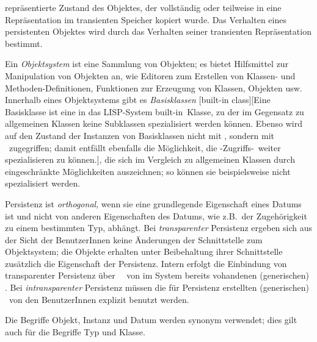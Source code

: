repr\"{a}sentierte Zustand des Objektes, der vollst\"{a}ndig oder teilweise
in eine Re\-pr\"{a}\-sen\-ta\-tion im transienten Speicher kopiert wurde.
Das Verhalten eines persistenten Objektes wird durch das Verhalten
seiner transienten Re\-pr\"{a}\-sen\-ta\-tion bestimmt.
%
\par{}Ein {\em Objektsystem\/} ist eine Sammlung von Objekten; es
bietet Hilfsmittel zur Manipulation von Objekten an, wie Editoren zum
Erstellen von Klassen- und Methoden-Definitionen, Funktionen
zur Erzeugung von Klassen, Objekten usw. Innerhalb eines Objektsystems
gibt es {\em Basisklassen\/}%
[built-in class][{Eine Basisklasse ist eine
in das LISP-System
\protect{}%
{built-in}\ Klasse, zu der im Gegensatz zu allgemeinen Klassen keine
Subklassen spezialisiert werden k\"{o}nnen. Ebenso wird auf den Zustand
der Instanzen von Basisklassen nicht mit \protect\mtd[n], sondern mit
\protect\fn[en]\ zugegriffen; damit entf\"{a}llt ebenfalls die
M\"{o}g\-lich\-keit, die \protect\std-Zugriffs-\protect\mtd[n]\ weiter
spezialisieren zu k\"{o}nnen.}], die sich im Vergleich zu allgemeinen
Klassen durch eingeschr\"{a}nkte M\"{o}glichkeiten auszeichnen; so k\"{o}nnen
sie beispielsweise nicht spezialisiert werden.
%
\par{}Persistenz ist {\em orthogonal\/}, wenn sie eine grundlegende
Eigenschaft eines Datums ist und nicht von anderen Eigenschaften des
Datums, wie z.B.\ der Zugeh\"{o}rigkeit zu einem bestimmten Typ,
abh\"{a}ngt. Bei {\em transparenter\/} Persistenz ergeben sich aus der
Sicht der BenutzerInnen keine \"{A}n\-de\-run\-gen der Schnittstelle zum
Objektsystem; die Objekte erhalten unter Beibehaltung ihrer
Schnittstelle zus\"{a}tzlich die Eigenschaft der Persistenz. Intern
erfolgt die Einbindung von transparenter Persistenz \"{u}ber
\spc\ \mtd[n]\ von im  System bereits vohandenen  (generischen)
\fn[en]. Bei {\em intransparenter\/} Persistenz m\"{u}ssen die f\"{u}r
Persistenz erstellten (generischen) \fn[en]\ von den BenutzerInnen
explizit benutzt werden.
%
\par{}Die Begriffe Objekt, Instanz und Datum werden synonym verwendet;
dies gilt auch f\"{u}r die Begriffe Typ und Klasse.
%
